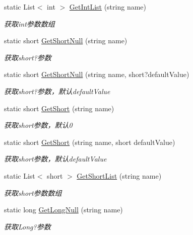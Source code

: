\begin{DoxyCompactItemize}
static List$<$ int $>$ \hyperlink{class_x_c_l_net_tools_1_1_string_hander_1_1_form_helper_a555eba05a8bdc2cab01e84b91e84f8c5}{Get\-Int\-List} (string name)
\begin{DoxyCompactList}\small\item\em 获取int参数数组 \end{DoxyCompactList}\item 
static short \hyperlink{class_x_c_l_net_tools_1_1_string_hander_1_1_form_helper_afe30b64436d0a1831330cd390f3f4b51}{Get\-Short\-Null} (string name)
\begin{DoxyCompactList}\small\item\em 获取short?参数 \end{DoxyCompactList}\item 
static short \hyperlink{class_x_c_l_net_tools_1_1_string_hander_1_1_form_helper_a23c16178ebaf6132bc6954dd098ed901}{Get\-Short\-Null} (string name, short?default\-Value)
\begin{DoxyCompactList}\small\item\em 获取short?参数，默认default\-Value \end{DoxyCompactList}\item 
static short \hyperlink{class_x_c_l_net_tools_1_1_string_hander_1_1_form_helper_a197c2283e3000030d40e7a50d10471f0}{Get\-Short} (string name)
\begin{DoxyCompactList}\small\item\em 获取short参数，默认0 \end{DoxyCompactList}\item 
static short \hyperlink{class_x_c_l_net_tools_1_1_string_hander_1_1_form_helper_a16b3f8a3141fb74656dc3c857da2099b}{Get\-Short} (string name, short default\-Value)
\begin{DoxyCompactList}\small\item\em 获取short参数，默认default\-Value \end{DoxyCompactList}\item 
static List$<$ short $>$ \hyperlink{class_x_c_l_net_tools_1_1_string_hander_1_1_form_helper_aa99502c5145f156f0e8b714d7ab4c308}{Get\-Short\-List} (string name)
\begin{DoxyCompactList}\small\item\em 获取short参数数组 \end{DoxyCompactList}\item 
static long \hyperlink{class_x_c_l_net_tools_1_1_string_hander_1_1_form_helper_abffef0560d4655c00c5bdd3e4ff087cc}{Get\-Long\-Null} (string name)
\begin{DoxyCompactList}\small\item\em 获取\-Long?参数 \end{DoxyCompactList}\item 

\end{DoxyCompactItemize}
